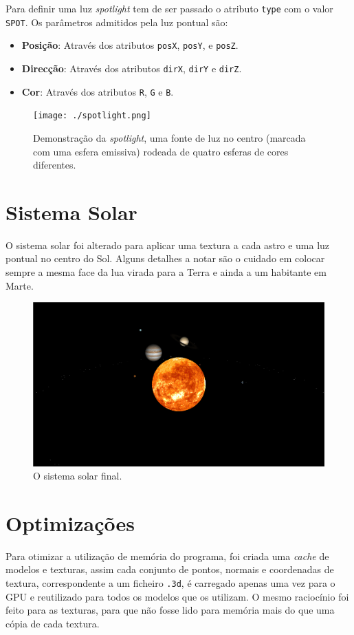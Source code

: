 \documentclass[a4paper]{article}
\begin{document}
Para definir uma luz \textit{spotlight} tem de ser passado o atributo
\texttt{type} com o valor \texttt{SPOT}. Os parâmetros admitidos pela luz
pontual são:

\begin{itemize}
    \item \textbf{Posição}: Através dos atributos \texttt{posX}, \texttt{posY},
        e \texttt{posZ}.
    \item \textbf{Direcção}: Através dos atributos \texttt{dirX}, \texttt{dirY}
        e \texttt{dirZ}.
    \item \textbf{Cor}: Através dos atributos \texttt{R}, \texttt{G} e
        \texttt{B}.
\end{itemize}

\begin{figure}[H]
    \centering
    \texttt{[image: ./spotlight.png]}
    \caption{Demonstração da \textit{spotlight}, uma fonte de luz no centro (marcada
    com uma esfera emissiva) rodeada de quatro esferas de cores diferentes.}
\end{figure}
\section{Sistema Solar}
O sistema solar foi alterado para aplicar uma textura a cada astro e uma luz
pontual no centro do Sol. Alguns detalhes a notar são o cuidado em colocar sempre
a mesma face da lua virada para a Terra e ainda a um habitante em Marte.

\begin{figure}[H]
    \includegraphics[width=\textwidth]{solarsystem.png}
    \caption{O sistema solar final.}
\end{figure}

\pagebreak

\section{Optimizações}
Para otimizar a utilização de memória do programa, foi criada uma
\textit{cache} de modelos e texturas, assim cada conjunto de pontos, normais e
coordenadas de textura, correspondente a um ficheiro \texttt{.3d}, é carregado
apenas uma vez para o GPU e reutilizado para todos os modelos que os utilizam.
O mesmo raciocínio foi feito para as texturas, para que não fosse lido para
memória mais do que uma cópia de cada textura.
\end{document}
